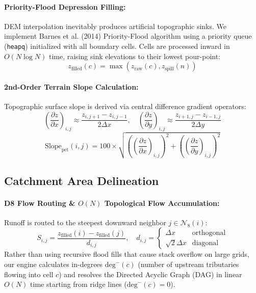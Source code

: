 \documentclass[manuscript,screen,review]{acmart}
\begin{document}
\paragraph{Priority-Flood Depression Filling:} DEM interpolation inevitably produces artificial topographic sinks. We implement Barnes et al. (2014) Priority-Flood algorithm using a priority queue (\texttt{heapq}) initialized with all boundary cells. Cells are processed inward in $O(N \log N)$ time, raising sink elevations to their lowest pour-point:
\begin{equation}
z_{\text{filled}}(c) = \max\left(z_{\text{raw}}(c), z_{\text{spill}}(n)\right)
\end{equation}

\paragraph{2nd-Order Terrain Slope Calculation:} Topographic surface slope is derived via central difference gradient operators:
\begin{equation}
\left(\frac{\partial z}{\partial x}\right)_{i,j} \approx \frac{z_{i,j+1} - z_{i,j-1}}{2\Delta x}, \quad \left(\frac{\partial z}{\partial y}\right)_{i,j} \approx \frac{z_{i+1,j} - z_{i-1,j}}{2\Delta y}
\end{equation}
\begin{equation}
\text{Slope}_{\text{pct}}(i,j) = 100 \times \sqrt{\left(\left(\frac{\partial z}{\partial x}\right)_{i,j}\right)^2 + \left(\left(\frac{\partial z}{\partial y}\right)_{i,j}\right)^2}
\end{equation}

\subsection{Catchment Area Delineation}
\paragraph{D8 Flow Routing \& $O(N)$ Topological Flow Accumulation:} Runoff is routed to the steepest downward neighbor $j \in \mathcal{N}_8(i)$:
\begin{equation}
S_{i,j} = \frac{z_{\text{filled}}(i) - z_{\text{filled}}(j)}{d_{i,j}}, \quad d_{i,j} = \begin{cases} \Delta x & \text{orthogonal} \\ \sqrt{2}\Delta x & \text{diagonal} \end{cases}
\end{equation}
Rather than using recursive flood fills that cause stack overflow on large grids, our engine calculates in-degrees $\text{deg}^-(c)$ (number of upstream tributaries flowing into cell $c$) and resolves the Directed Acyclic Graph (DAG) in linear $O(N)$ time starting from ridge lines ($\text{deg}^-(c) = 0$).
\end{document}
